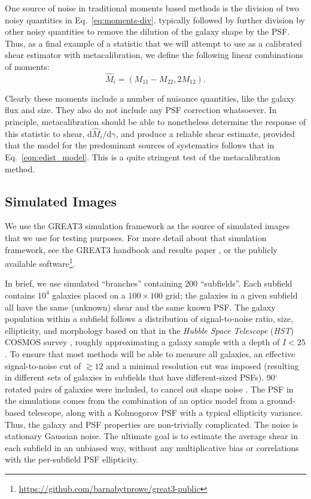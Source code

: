 \documentclass[iop]{emulateapj}
\begin{document}
One source of noise in traditional moments based methods is the division of two noisy quantities in
Eq.~\ref{eq:moments-div}, typically followed by further division by other noisy quantities to remove
the dilution of the galaxy shape by the PSF.  Thus, as a final example of a statistic that we will
attempt to use as a calibrated shear estimator with metacalibration, we define the following linear
combinations of moments:
\begin{equation}
\hat{M}_i = (M_{11}-M_{22}, 2M_{12}).
\end{equation}

Clearly these moments include a number of nuisance quantities, like the galaxy flux and size.  They
also do not include any PSF correction whatsoever.  In principle, metacalibration should be able to
nonetheless determine the response of this statistic to shear,
$\mathrm{d}\hat{M}_i/\mathrm{d}\gamma$, and produce a reliable shear estimate, provided that the
model for the predominant sources of systematics follows that in Eq.~\ref{eqn:edist_model}.  This is
a quite stringent test of the metacalibration method.

\subsection{Simulated Images}

We use the GREAT3 simulation framework as the source of simulated images that we use for testing
purposes.  For more detail about that simulation framework, see the GREAT3 handbook
\citep{2014ApJS..212....5M} and results paper \citep{2015MNRAS.450.2963M}, or the publicly
available software\footnote{\url{https://github.com/barnabytprowe/great3-public}}.

In brief, we use simulated ``branches'' containing 200 ``subfields''.  Each subfield contains $10^4$
galaxies placed on a $100\times 100$ grid; the galaxies in a given subfield all have the same
(unknown) shear and the same known PSF.  The galaxy population within a subfield follows a
distribution of signal-to-noise ratio, size, ellipticity, and morphology based on that in the {\it
  Hubble Space Telescope} ({\it HST}) COSMOS survey
\citep{2007ApJS..172..196K,2007ApJS..172....1S,2007ApJS..172...38S}, roughly approximating a galaxy
sample with a depth of $I<25$.  To ensure that most methods will be able to measure all galaxies, an
effective signal-to-noise cut of $\gtrsim 12$ and a minimal resolution cut was imposed (resulting in
different sets of galaxies in subfields that have different-sized PSFs).  90$^\circ$ rotated pairs
of galaxies were included, to cancel out shape noise \citep{2007MNRAS.376...13M}.  The PSF in the
simulations comes from the combination of an optics model from a ground-based telescope, along with
a Kolmogorov PSF with a typical ellipticity variance.  Thus, the galaxy and PSF properties are
non-trivially complicated.  The noise is stationary Gaussian noise.  The
ultimate goal is to estimate the average shear in each subfield in an unbiased way, without any
multiplicative bias or correlations with the per-subfield PSF ellipticity.
\end{document}
